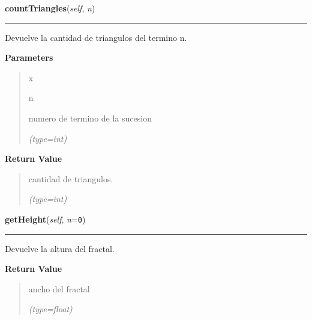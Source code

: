 \hspace{.8\funcindent}\begin{boxedminipage}{\funcwidth}

    \raggedright \textbf{countTriangles}(\textit{self}, \textit{n})

    \vspace{-1.5ex}

    \rule{\textwidth}{0.5\fboxrule}
\setlength{\parskip}{2ex}
    Devuelve la cantidad de triangulos del termino n.

\setlength{\parskip}{1ex}
      \textbf{Parameters}
      \vspace{-1ex}

      \begin{quote}
        \begin{Ventry}{x}

          \item[n]

          numero de termino de la sucesion

            {\it (type=int)}

        \end{Ventry}

      \end{quote}

      \textbf{Return Value}
    \vspace{-1ex}

      \begin{quote}
      cantidad de triangulos.

      {\it (type=int)}

      \end{quote}

    \end{boxedminipage}

    \label{FractalZE:sierpinsky:Sierpinsky:getHeight}

    \vspace{0.5ex}

\hspace{.8\funcindent}\begin{boxedminipage}{\funcwidth}

    \raggedright \textbf{getHeight}(\textit{self}, \textit{n}={\tt 0})

    \vspace{-1.5ex}

    \rule{\textwidth}{0.5\fboxrule}
\setlength{\parskip}{2ex}
    Devuelve la altura del fractal.

\setlength{\parskip}{1ex}
      \textbf{Return Value}
    \vspace{-1ex}

      \begin{quote}
      ancho del fractal

      {\it (type=float)}

      \end{quote}

    \end{boxedminipage}

